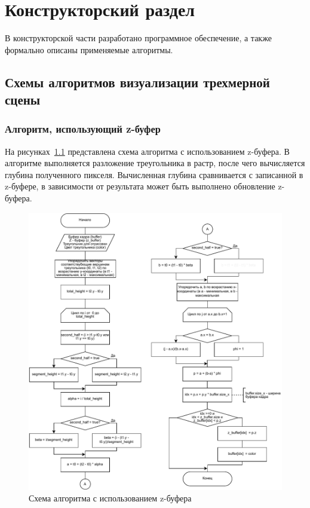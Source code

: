 \chapter{Конструкторский раздел}	
В конструкторской части разработано программное обеспечение, а также формально описаны применяемые алгоритмы.

\section{Схемы алгоритмов визуализации трехмерной сцены}
\subsection{Алгоритм, использующий z-буфер}
На рисунках~\ref{fig:z_buf_2} представлена схема алгоритма с использованием z-буфера. В алгоритме выполняется разложение треугольника в растр, после чего вычисляется глубина полученного пикселя. Вычисленная глубина сравнивается с записанной в z-буфере, в зависимости от результата может быть выполнено обновление z-буфера.  

\begin{figure}[H]
	\centering
	\includegraphics[width=1.0\textwidth, page=1]{assets/img/z-bufer-full.pdf}   
	\caption{Схема алгоритма с использованием z-буфера}
	\label{fig:z_buf_2}
\end{figure}


